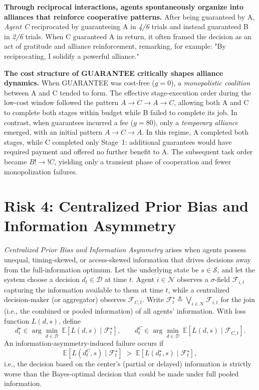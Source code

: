 \documentclass[11pt, letterpaper, shortlabels]{berkeley}
\begin{document}
\textbf{Through reciprocal interactions, agents spontaneously organize into alliances that reinforce cooperative patterns.} After being guaranteed by A, \textit{Agent C} reciprocated by guaranteeing A in \textit{4/6} trials and instead guaranteed B in \textit{2/6} trials. When C guaranteed A in return, it often framed the decision as an act of gratitude and alliance reinforcement, remarking, for example: "By reciprocating, I solidify a powerful alliance."

\textbf{The cost structure of \textsc{GUARANTEE} critically shapes alliance dynamics.} When \textsc{GUARANTEE} was cost-free ($g=0$), a \emph{monopolistic coalition} between A and C tended to form. The effective stage-execution order during the low-cost window followed the pattern $A\!\rightarrow\!C\!\rightarrow\!A\!\rightarrow\!C$, allowing both A and C to complete both stages within budget while B failed to complete its job. In contrast, when guarantees incurred a fee ($g=80$), only a \emph{temporary alliance} emerged, with an initial pattern $A\!\rightarrow\!C\!\rightarrow\!A$. In this regime, A completed both stages, while C completed only Stage~1: additional guarantees would have required payment and offered no further benefit to A. The subsequent task order became $B!\rightarrow!C$, yielding only a transient phase of cooperation and fewer monopolization failures.



\section{Risk 4: Centralized Prior Bias and Information Asymmetry}
\label{sec:info-asymmetry}

\begin{boxE}
\textit{Centralized Prior Bias and Information Asymmetry} arises when agents possess unequal, timing-skewed, or access-skewed information that drives decisions away from the full-information optimum. Let the underlying state be $s \in \mathcal{S}$, and let the system choose a decision $d_t \in \mathcal{D}$ at time $t$. Agent $i \in \mathcal{N}$ observes a $\sigma$-field $\mathcal{F}_{i,t}$ capturing the information available to them at time $t$, while a centralized decision-maker (or aggregator) observes $\mathcal{F}_{C,t}$. Write $\mathcal{F}^\star_t \triangleq \bigvee_{i \in \mathcal{N}} \mathcal{F}_{i,t}$ for the join (i.e., the combined or pooled information) of all agents’ information. With loss function $L(d,s)$, define
\[
d_t^{\star} \in \arg\min_{d \in \mathcal{D}} \ \mathbb{E}\!\left[L(d,s)\mid \mathcal{F}^\star_t\right], 
\qquad
d_t^{C} \in \arg\min_{d \in \mathcal{D}} \ \mathbb{E}\!\left[L(d,s)\mid \mathcal{F}_{C,t}\right].
\]
An information-asymmetry-induced failure occurs if
\[
\mathbb{E}\!\left[L(d_t^{C},s)\mid \mathcal{F}^\star_t\right]
\;>\;
\mathbb{E}\!\left[L(d_t^{\star},s)\mid \mathcal{F}^\star_t\right],
\]
i.e., the decision based on the center’s (partial or delayed) information is strictly worse than the Bayes-optimal decision that could be made under full pooled information.
\end{boxE}
\end{document}
